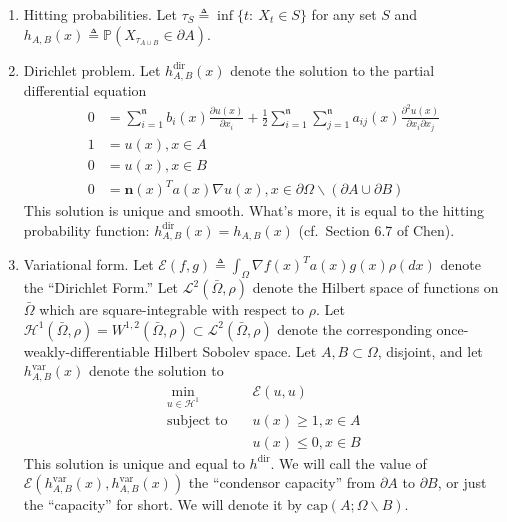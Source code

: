\documentclass[english, aip, jcp, priprint, graphicx,floatfix]{revtex4-1}
\theoremstyle{plain}
\theoremstyle{definition}
\theoremstyle{plain}
\newcommand{\dimension}{{\mathfrak{n}}}
\newcommand{\capac}[2]{\mathrm{cap}\left(#1;#2\right)}
\begin{document}
\begin{enumerate}
    \item Hitting probabilities.  Let $\tau_S \triangleq \inf\{t:\ X_t \in S\}$ for any set $S$ and $h_{A,B}(x) \triangleq \mathbb{P}(X_{\tau_{A\cup B}}\in \partial A)$.
    
    \item Dirichlet problem.  Let $h^\mathrm{dir}_{A,B}(x)$ denote the solution to the partial differential equation
    \begin{align*}
    0 &= \sum_{i = 1}^\dimension b_i (x) \frac{\partial u
        (x)}{\partial x_i} + \frac{1}{2} \sum_{i = 1}^\dimension \sum_{j = 1}^\dimension a_{ij} (x)
        \frac{\partial^2 u (x)}{\partial x_i \partial x_j}\\
    1 &= u(x),x\in A \\
    0 &= u(x) ,x\in B \\
    0 &= \mathbf{n}(x)^Ta(x)\nabla u(x), x \in \partial{\Omega} \backslash (\partial A \cup \partial B)
    \end{align*}
    This solution is unique and smooth.\cite{lieberman1986mixed}  What's more, it is equal to the hitting probability function: $h^\mathrm{dir}_{A,B}(x)=h_{A,B}(x)$ (cf.\ Section 6.7 of Chen\cite{chen2012symmetric}).

    \item Variational form.  Let $\mathscr{E}(f,g)\triangleq \int_\Omega \nabla f(x)^T a(x) g(x) \rho(dx)$ denote the ``Dirichlet Form.''  Let $\mathscr L^2(\bar \Omega,\rho)$ denote the Hilbert space of functions on $\bar \Omega$ which are square-integrable with respect to $\rho$.  Let $\mathcal{H}^1(\bar \Omega,\rho)=W^{1,2}(\bar \Omega,\rho) \subset \mathscr{L}^2(\bar \Omega,\rho)$ denote the corresponding once-weakly-differentiable Hilbert Sobolev space.  Let $A,B\subset \Omega$, disjoint, and let $h^\mathrm{var}_{A,B}(x)$ denote the solution to 
    \begin{align*}
    \min_{u \in \mathcal H^1} \quad & \mathscr{E}(u,u) \\
    \mbox{subject to} \quad & u(x)\geq1,x\in A \\
     & u(x)\leq0,x\in B
    \end{align*}
    This solution is unique and equal to $h^\mathrm{dir}$.\cite{karatson2005discrete}  We will call the value of $\mathscr{E}(h^\mathrm{var}_{A,B}(x),h^\mathrm{var}_{A,B}(x))$ the ``condensor capacity'' from $\partial A$ to $\partial B$, or just the ``capacity'' for short.  We will denote it by $\capac{A}{\Omega \backslash B}$.
\end{enumerate}
\end{document}
